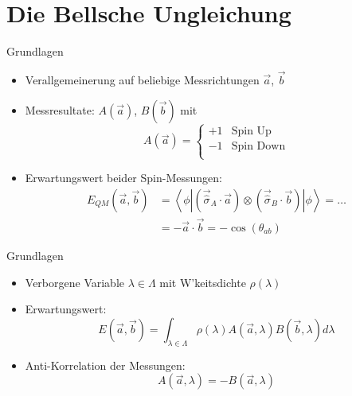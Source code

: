 \documentclass{beamer}
\begin{document}
\section{Die Bellsche Ungleichung}
\begin{frame}{Grundlagen}
    \begin{itemize}
        \item Verallgemeinerung auf beliebige Messrichtungen $\vec{a}$, $\vec{b}$
        \item Messresultate: $A(\vec{a})$, $B(\vec{b})$ mit
                \[
                    A(\vec{a}) = \begin{cases}
                        +1 & \text{Spin Up} \\
                        -1 & \text{Spin Down} \\
                    \end{cases}
                \]
        \item Erwartungswert beider Spin-Messungen:
                \begin{align*}
                    E_{QM}(\vec{a},\vec{b})
                    &= \left\langle \phi \left| 
                    \left( \vec{\hat{\sigma}}_A \cdot \vec{a} \right)
                            \otimes \left( \vec{\hat{\sigma}}_B \cdot \vec{b} \right)
                    \right| \phi \right\rangle
                    = \dots \\
                    &= - \vec{a} \cdot \vec{b} = - \cos(\theta_{ab})
                \end{align*}
    \end{itemize}
\end{frame}
\begin{frame}{Grundlagen}
    \begin{itemize}
        \item Verborgene Variable $\lambda \in \Lambda$ mit W'keitsdichte $\rho(\lambda)$
        \item Erwartungswert:
            \[
                E(\vec{a},\vec{b}) = \int_{\lambda\in\Lambda} 
                    \rho(\lambda) A(\vec{a},\lambda) B(\vec{b},\lambda) d\lambda
            \]
        \item<2-> Anti-Korrelation der Messungen:
            \[
                A(\vec{a},\lambda) = -B(\vec{a},\lambda)
            \]
    \end{itemize}
\end{frame}
\end{document}
